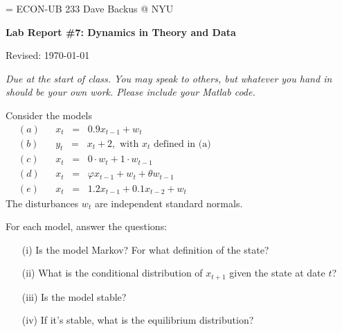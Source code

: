 \documentclass[11pt]{exam}
\begin{document}
\parskip=\bigskipamount
\parindent=0.0in
\thispagestyle{empty}
{\large ECON-UB 233 \hfill Dave Backus @ NYU}

\bigskip\bigskip
\centerline{\Large \bf Lab Report \#7:  Dynamics in Theory and Data}
\centerline{Revised: \today}

\bigskip
{\it Due at the start of class.
You may speak to others, but whatever you hand in should be your own work.
Please include your Matlab code.}


\begin{questions}
Consider the models
\begin{eqnarray*}
(a) &&  x_t \;\;=\;\; 0.9 x_{t-1} +  w_t \phantom{xxxxxxxxxxxxxxxxxxxxxxxxxxxxxxxxxxxx}\\
(b) &&  y_t \;\;=\;\; x_t + 2, \mbox{ with $x_t$ defined in (a)} \\
(c) &&  x_t \;\;=\;\; 0 \cdot w_t + 1 \cdot w_{t-1} \\
(d) &&  x_t \;\;=\;\; \varphi x_{t-1} + w_t + \theta  w_{t-1} \\
(e) &&  x_t \;\;=\;\; 1.2 x_{t-1} + 0.1 x_{t-2} +  w_t
\end{eqnarray*}
The disturbances $w_t$ are independent standard normals.

For each model,  answer the questions:
\begin{enumerate}
\item [(i)] Is the model Markov?  For what definition of the state? %
\item [(ii)] What is the conditional distribution of $x_{t+1}$ given
the state at date $t$? %
\item [(iii)] Is the model stable?
\item [(iv)] If it's stable, what is the equilibrium distribution?
\end{enumerate}



\end{questions}
\end{document}

